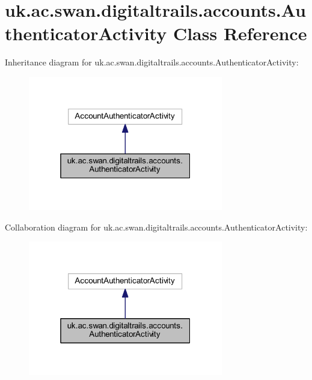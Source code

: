 \hypertarget{classuk_1_1ac_1_1swan_1_1digitaltrails_1_1accounts_1_1_authenticator_activity}{\section{uk.\+ac.\+swan.\+digitaltrails.\+accounts.\+Authenticator\+Activity Class Reference}
\label{classuk_1_1ac_1_1swan_1_1digitaltrails_1_1accounts_1_1_authenticator_activity}
}


Inheritance diagram for uk.\+ac.\+swan.\+digitaltrails.\+accounts.\+Authenticator\+Activity\+:\nopagebreak
\begin{figure}[H]
\begin{center}
\leavevmode
\includegraphics[width=241pt]{classuk_1_1ac_1_1swan_1_1digitaltrails_1_1accounts_1_1_authenticator_activity__inherit__graph}
\end{center}
\end{figure}


Collaboration diagram for uk.\+ac.\+swan.\+digitaltrails.\+accounts.\+Authenticator\+Activity\+:\nopagebreak
\begin{figure}[H]
\begin{center}
\leavevmode
\includegraphics[width=241pt]{classuk_1_1ac_1_1swan_1_1digitaltrails_1_1accounts_1_1_authenticator_activity__coll__graph}
\end{center}
\end{figure}

